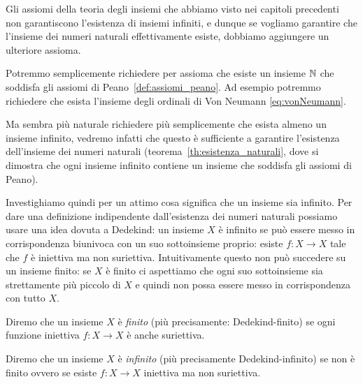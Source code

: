 Gli assiomi della teoria degli insiemi che abbiamo visto nei capitoli precedenti
non garantiscono l'esistenza di insiemi infiniti, e dunque se 
vogliamo garantire che l'insieme dei numeri naturali effettivamente esiste, 
dobbiamo aggiungere un ulteriore assioma. 

Potremmo semplicemente richiedere per assioma che esiste un insieme ${\mathbb N}$ che soddisfa gli assiomi
di Peano~\ref{def:assiomi_peano}.
Ad esempio potremmo richiedere 
che esista l'insieme degli ordinali di Von Neumann \eqref{eq:vonNeumann}. 

Ma sembra più naturale richiedere più semplicemente che esista almeno un insieme infinito,
vedremo infatti che questo è sufficiente a garantire l'esistenza dell'insieme dei numeri naturali
(teorema~\ref{th:esistenza_naturali}, dove si dimostra che ogni insieme infinito contiene un insieme 
che soddisfa gli assiomi di Peano).

Investighiamo quindi per un attimo cosa significa che un insieme sia infinito.
Per dare una definizione indipendente dall'esistenza dei numeri naturali possiamo usare 
una idea dovuta a Dedekind:
un insieme $X$ è infinito se può essere messo in corrispondenza 
biunivoca con un suo sottoinsieme proprio: 
esiste $f\colon X\to X$ tale che $f$ è iniettiva ma non suriettiva. 
Intuitivamente questo non può succedere su un insieme finito: 
se $X$ è finito ci aspettiamo che ogni suo sottoinsieme sia strettamente più piccolo di $X$
e quindi non possa essere messo in corrispondenza con tutto $X$.

\begin{definition}
  \label{def:infinito}%
  Diremo che un insieme $X$ è \emph{finito}
  (più precisamente: Dedekind-finito)
  se ogni funzione iniettiva $f\colon X\to X$ è anche suriettiva.
%

  Diremo che un insieme $X$ è \emph{infinito} 
  (più precisamente Dedekind-infinito)
  se non è finito ovvero
  se esiste $f\colon X\to X$ iniettiva ma non suriettiva.
%
\end{definition}

